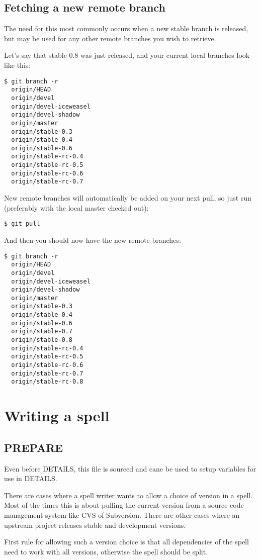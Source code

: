 \documentclass[a4paper,10pt]{book}
\begin{document}
\section{Fetching a new remote branch}
The need for this most commonly occurs when a new stable branch is released,
but may be used for any other remote branches you wish to retrieve.

Let's say that stable-0.8 was just released, and your current local branches
look like this:
\begin{verbatim}
$ git branch -r
  origin/HEAD
  origin/devel
  origin/devel-iceweasel
  origin/devel-shadow
  origin/master
  origin/stable-0.3
  origin/stable-0.4
  origin/stable-0.6
  origin/stable-rc-0.4
  origin/stable-rc-0.5
  origin/stable-rc-0.6
  origin/stable-rc-0.7
\end{verbatim}

New remote branches will automatically be added on your next pull, so just run
(preferably with the local master checked out):
\begin{verbatim}
$ git pull
\end{verbatim}
And then you should now have the new remote branches:
\begin{verbatim}
$ git branch -r
  origin/HEAD
  origin/devel
  origin/devel-iceweasel
  origin/devel-shadow
  origin/master
  origin/stable-0.3
  origin/stable-0.4
  origin/stable-0.6
  origin/stable-0.7
  origin/stable-0.8
  origin/stable-rc-0.4
  origin/stable-rc-0.5
  origin/stable-rc-0.6
  origin/stable-rc-0.7
  origin/stable-rc-0.8
\end{verbatim}

\chapter{Writing a spell}
\section{PREPARE}
Even before DETAILS, this file is sourced and cane be used to setup variables
for use in DETAILS.

There are cases where a spell writer wants to allow a choice of version in a
spell. Most of the times this is about pulling the current version from a
source code management system like CVS of Subversion. There are other cases
where an upstream project releases stable and development versions.

First rule for allowing such a version choice is that all dependencies of the
spell need to work with all versions, otherwise the spell should be split.
\end{document}
